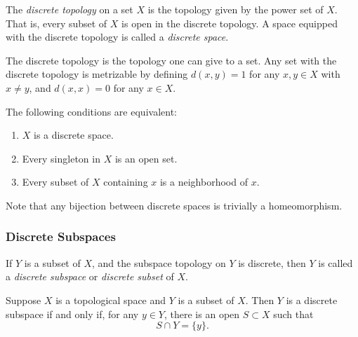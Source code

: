 \documentclass[12pt]{article}
\begin{document}
The \emph{discrete topology} on a set $X$ is the topology given by
the power set of $X$. That is, every subset of $X$ is open in the discrete topology.  A space equipped with the discrete topology is called a \emph{discrete space}.

The discrete topology is the  topology one can give to a set.  Any set with the discrete topology is metrizable by defining $d(x,y)=1$ for any $x,y\in X$ with $x\neq y$, and $d(x,x)=0$ for any $x\in X$.

The following conditions are equivalent:
\begin{enumerate}
\item $X$ is a discrete space. 
\item 
Every singleton in $X$ is an open set.
\item 
Every subset of $X$ containing $x$ is a neighborhood of $x$.
\end{enumerate}

Note that any bijection between discrete spaces is trivially a homeomorphism.

\subsubsection*{Discrete Subspaces}If $Y$ is a subset of $X$, and the subspace topology on $Y$ is discrete, then $Y$ is called a \emph{discrete subspace} or \emph{discrete subset} of $X$.

Suppose $X$ is a topological space and $Y$ is a subset of $X$. Then $Y$ is a  discrete subspace if and only if, for any $y\in Y$, there is an open $S\subset X$ such that \[S\cap Y=\{y\}.\] 
\end{document}
